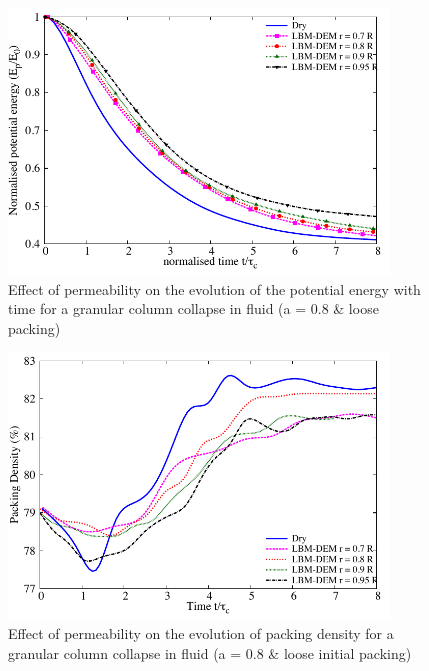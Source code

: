 \begin{figure}
	\centering
    \includegraphics[width=0.9\textwidth]{PE_a08_loose}
    \caption{Effect of permeability on the evolution of the potential energy 
    with time for a granular column collapse in fluid (a = 0.8 \& loose 
    packing)}
    \label{fig:PE_a08_loose}
\end{figure}


\begin{figure}
	\centering
    \includegraphics[width=0.9\textwidth]{Packing_Density_a08_loose}
    \caption{Effect of permeability on the evolution of packing density for a 
    granular column collapse in fluid (a = 0.8 \& loose initial packing)}
    \label{fig:Packing_Density_a08_loose}
\end{figure}

